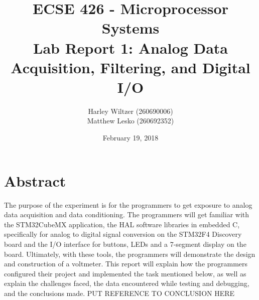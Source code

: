 \documentclass[12pt]{report}
\title{ECSE 426 - Microprocessor Systems\\Lab Report 1: Analog Data Acquisition, Filtering, and
Digital I/O}
\author{Harley Wiltzer (260690006)\\Matthew Lesko (260692352)}
\date{February 19, 2018}
\begin{document}
\maketitle
\tableofcontents
\let\clearpage\relax
\listoffigures
\let\clearpage\relax
\listoftables
\newpage
\section{Abstract}
The purpose of the experiment is for the programmers to get exposure to analog data acquisition and
data conditioning. The programmers will get familiar with the STM32CubeMX application, the HAL
software libraries in embedded C, specifically for analog to digital signal conversion on the
STM32F4 Discovery board and the I/O interface for buttons, LEDs and a 7-segment display on the
board. Ultimately, with these tools, the programmers will demonstrate the design and construction of
a voltmeter. This report will explain how the programmers configured their project and implemented the
task mentioned below, as well as explain the challenges faced, the data
encountered while testing and debugging, and the conclusions made. PUT REFERENCE TO CONCLUSION HERE
\end{document}
